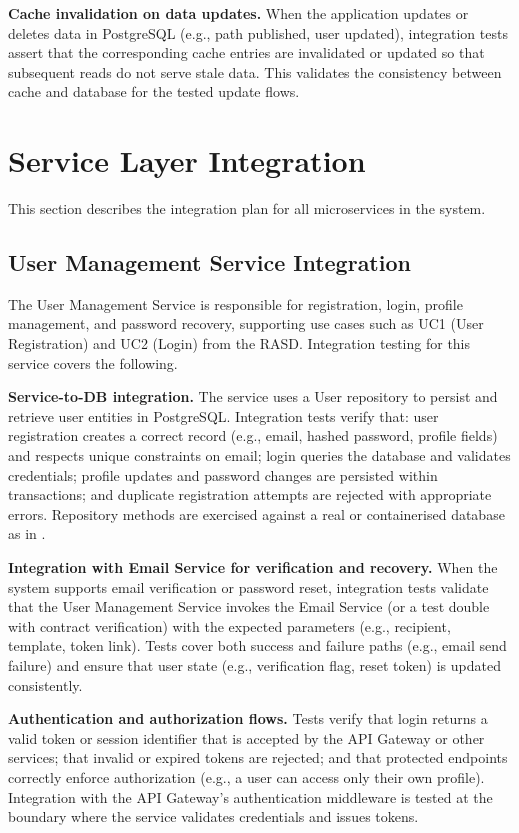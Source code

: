 \textbf{Cache invalidation on data updates.} When the application updates or deletes data in PostgreSQL (e.g., path published, user updated), integration tests assert that the corresponding cache entries are invalidated or updated so that subsequent reads do not serve stale data. This validates the consistency between cache and database for the tested update flows.

\section{Service Layer Integration}
\label{sec:service_layer_integration}%

This section describes the integration plan for all microservices in the system.

\subsection{User Management Service Integration}
\label{subsec:user_management_service_integration}%

The User Management Service is responsible for registration, login, profile management, and password recovery, supporting use cases such as UC1 (User Registration) and UC2 (Login) from the RASD. Integration testing for this service covers the following.

\textbf{Service-to-DB integration.} The service uses a User repository to persist and retrieve user entities in PostgreSQL. Integration tests verify that: user registration creates a correct record (e.g., email, hashed password, profile fields) and respects unique constraints on email; login queries the database and validates credentials; profile updates and password changes are persisted within transactions; and duplicate registration attempts are rejected with appropriate errors. Repository methods are exercised against a real or containerised database as in .

\textbf{Integration with Email Service for verification and recovery.} When the system supports email verification or password reset, integration tests validate that the User Management Service invokes the Email Service (or a test double with contract verification) with the expected parameters (e.g., recipient, template, token link). Tests cover both success and failure paths (e.g., email send failure) and ensure that user state (e.g., verification flag, reset token) is updated consistently.

\textbf{Authentication and authorization flows.} Tests verify that login returns a valid token or session identifier that is accepted by the API Gateway or other services; that invalid or expired tokens are rejected; and that protected endpoints correctly enforce authorization (e.g., a user can access only their own profile). Integration with the API Gateway's authentication middleware is tested at the boundary where the service validates credentials and issues tokens.

